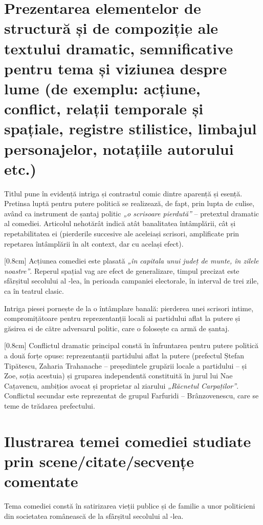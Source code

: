 \section{Prezentarea elementelor de structură și de compoziție ale textului dramatic, semnificative pentru tema și viziunea despre lume {\footnotesize\normalfont(de exemplu: acțiune, conflict, relații temporale și spațiale, registre stilistice, limbajul personajelor, notațiile autorului etc.)}}

Titlul pune în evidență intriga și contrastul comic dintre aparență și esență. Pretinsa luptă pentru putere politică se realizează, de fapt, prin lupta de culise, având ca instrument de șantaj politic \textit{„o scrisoare pierdută”} -- pretextul dramatic al comediei. Articolul nehotărât indică atât banalitatea întâmplării, cât și repetabilitatea ei (pierderile succesive ale aceleiași scrisori, amplificate prin repetarea întâmplării în alt context, dar cu același efect).

[0.8cm]
Acțiunea comediei este plasată \textit{„în capitala unui județ de munte, în zilele noastre”}. Reperul spațial vag are efect de generalizare, timpul precizat este sfârșitul secolului al -lea, în perioada campaniei electorale, în interval de trei zile, ca în teatrul clasic.

Intriga piesei pornește de la o întâmplare banală: pierderea unei scrisori intime, compromițătoare pentru reprezentanții locali ai partidului aflat la putere și găsirea ei de către adversarul politic, care o folosește ca armă de șantaj.

[0.8cm]
Conflictul dramatic principal constă în înfruntarea pentru putere politică a două forțe opuse: reprezentanții partidului aflat la putere (prefectul Ștefan Tipătescu, Zaharia Trahanache -- președintele grupării locale a partidului -- și Zoe, soția acestuia) și gruparea independentă constituită în jurul lui Nae Cațavencu, ambițios avocat și proprietar al ziarului \textit{„Răcnetul Carpaților”}. Conflictul secundar este reprezentat de grupul Farfuridi -- Brânzovenescu, care se teme de trădarea prefectului.


\section{Ilustrarea temei comediei studiate prin scene/citate/secvențe comentate}

Tema comediei constă în satirizarea vieții publice și de familie a unor politicieni din societatea românească de la sfârșitul secolului al -lea.

